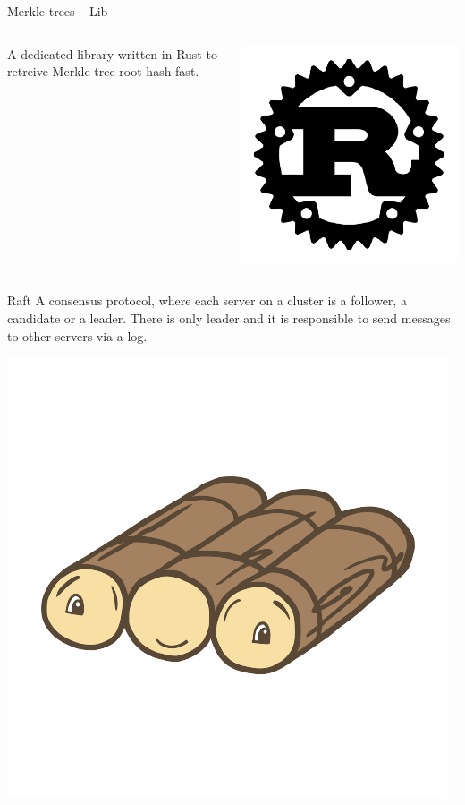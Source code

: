 \begin{frame}{Merkle trees -- Lib}
    \begin{columns}[c]
        \begin{column}{0.7\textwidth}
            A dedicated library written in Rust to retreive Merkle tree root
            hash fast.
        \end{column}
        \begin{column}{0.3\textwidth}
            \centering
            \includegraphics[width=.4\linewidth]{static/rust-logo.png}
        \end{column}
    \end{columns}

\end{frame}

\begin{frame}{Raft}
A consensus protocol, where each server on a cluster is a follower, a candidate
or a leader. There is only leader and it is responsible to send messages to other servers via a log.

\centering
\includegraphics[width=.4\linewidth]{static/raft-logo.png}

\end{frame}

